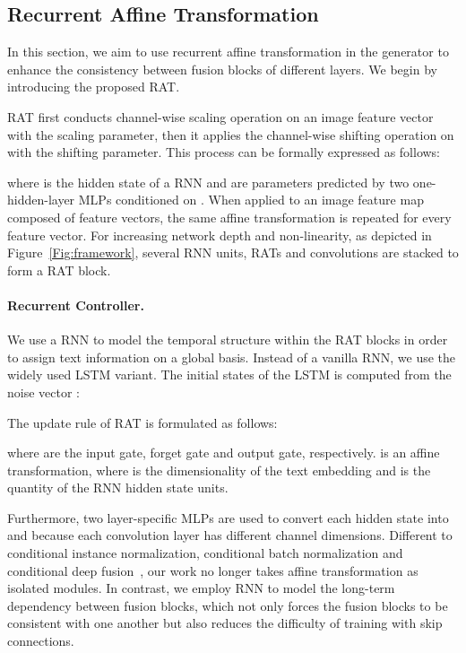 \documentclass{article}
\begin{document}
	
	\subsection{ Recurrent Affine Transformation\label{generator}}

	
	
	
	
	In this section, we aim to use recurrent affine transformation in the generator to enhance the consistency between fusion blocks of different layers. We begin by introducing the proposed  RAT.

    RAT first conducts channel-wise scaling operation on an image feature vector  with the scaling parameter, then it applies the channel-wise shifting operation on  with the shifting parameter. This process can be formally expressed as follows:
	
	where  is the hidden state of a RNN and  are parameters predicted by two one-hidden-layer MLPs conditioned on .
	When applied to an image feature map composed of  feature vectors, the same affine transformation is repeated for every feature vector. For increasing network depth and non-linearity, as depicted in Figure~\ref{Fig:framework}, several RNN units, RATs and convolutions are stacked to form a RAT block.
	\paragraph{Recurrent Controller.} We use a RNN to model the temporal structure within the RAT blocks in order to assign text information on a global basis. Instead of a vanilla RNN, we use the widely used  LSTM variant. The initial states of the LSTM is computed from the noise vector : 
	
	The update rule of RAT is formulated as follows:
	
	where  are the input gate, forget gate and output gate, respectively.  is an affine transformation, where  is the dimensionality of the text embedding and  is the quantity of the RNN hidden state units. 
	
	Furthermore, two layer-specific MLPs are used to convert each hidden state  into  and  because each convolution layer has different channel dimensions. Different to conditional instance normalization, conditional batch normalization and conditional deep fusion~\cite{DBLP:journals/corr/abs-2008-05865}, our work no longer takes affine transformation as isolated modules. In contrast, we employ RNN to model the long-term dependency between fusion blocks, which not only forces the fusion blocks to be consistent with one another but also reduces the difficulty of training with skip connections.
	
\end{document}
